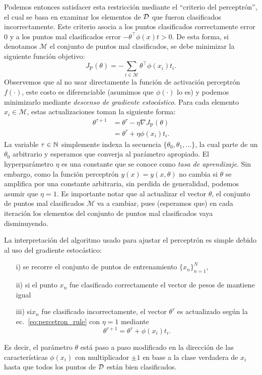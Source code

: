 Podemos entonces satisfacer esta restricción mediante el ``criterio del perceptrón'', el cual se basa en examinar  los elementos de ${\mathcal D}$ que fueron clasificados incorrectamente. Este criterio asocia a los puntos clasificados correctamente error 0 y a los puntos mal clasificados error $-\theta^\top\phi(x)t>0$. De esta forma, si denotamos $\mathcal{M}$ el conjunto de puntos mal clasificados, se debe minimizar la siguiente función objetivo:
\begin{equation}
	J_\text{P}(\theta) = -\sum_{i\in\mathcal{M}}\theta^\top\phi(x_i)t_i. 
\end{equation}
Observemos que al no usar directamente la función de activación perceptrón $f(\cdot)$, este costo es diferenciable (asumimos que $\phi(\cdot)$ lo es) y podemos  minimizarlo mediante \emph{descenso de gradiente estocástico}. Para cada elemento $x_i\in\mathcal{M}$, estas actualizaciones toman la siguiente forma:
\begin{align}
	\theta^{\tau+1} &= \theta^\tau - \eta \nabla J_\text{P}(\theta)\nonumber\\
	&= \theta^\tau + \eta \phi(x_i)t_i.\label{eq:percetron_rule}
\end{align}
La variable $\tau\in{\mathbb N}$ simplemente indexa la secuencia $\{\theta_0,\theta_1,\ldots\}$, la cual  parte de un $\theta_0$ arbitrario y esperamos que converja al parámetro apropiado. El hyperparámetro $\eta$ es una constante que se conoce como \emph{tasa de aprendizaje}. Sin embargo, como la función perceptrón $y(x)=y(x,\theta)$ no cambia si $\theta$ se amplifica por una constante arbitraria, sin perdida de generalidad, podemos asumir que $\eta=1$. Es importante notar que al actualizar el vector $\theta$, el conjunto de puntos mal clasificados $\mathcal{M}$ va a cambiar, pues (esperamos que) en cada iteración los elementos del conjunto de puntos mal clasificados vaya disminuyendo.

La interpretación del algoritmo usado para ajustar el perceptrón es simple debido al uso del gradiente estocástico: 
\begin{itemize}
	\item[i)] se recorre el conjunto de puntos de entrenamiento $\{x_n\}_{n=1}^N$,
	\item[ii)] si el punto $x_n$ fue clasificado correctamente el vector de pesos de mantiene igual
	\item[iii)] si$x_n$ fue clasificado incorrectamente, el vector $\theta^\tau$ es actualizado según la ec.~\eqref{eq:percetron_rule} con $\eta=1$ mediante
	\begin{equation}
	 \theta^{\tau+1} = \theta^\tau + \phi(x_i)t_i.
\end{equation}
\end{itemize}
Es decir, el parámetro $\theta$ está paso a paso modificado en la dirección de las características $\phi(x_i)$ con multiplicador $\pm1$ en base a la clase verdadera de $x_i$ hasta  que todos los puntos de ${\mathcal D}$ están bien clasificados. 

